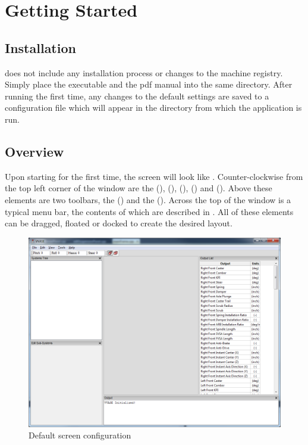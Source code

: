 \chapter{Getting Started} \label{ch:gettingStarted}

\section{Installation} \label{sec:installation}

\vvase{} does not include any installation process or changes to the machine registry.  Simply place the executable and the pdf manual into the same directory.  After running the first time, any changes to the default settings are saved to a configuration file which will appear in the directory from which the application is run.

\section{Overview} \label{sec:overview}

Upon starting \vvase{} for the first time, the screen will look like .  Counter-clockwise from the top left corner of the window are the  (),  (),  (),  () and  ().  Above these elements are two toolbars, the  () and the  ().  Across the top of the window is a typical menu bar, the contents of which are described in .  All of these elements can be dragged, floated or docked to create the desired layout.

\begin{figure}
  \includegraphics[width=\textwidth]{images/defaultStartup}
  \caption{Default screen configuration} \label{fig:defaultStartup}
  \centering
\end{figure}

